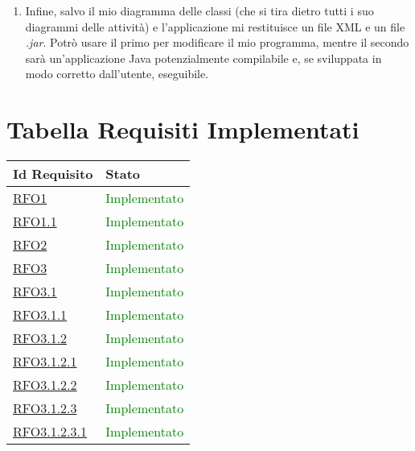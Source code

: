 \begin{enumerate}
	\item Infine, salvo il mio diagramma delle classi (che si tira dietro tutti i suo diagrammi delle attività) e l'applicazione mi restituisce un file XML e un file \emph{.jar}. Potrò usare il primo per modificare il mio programma, mentre il secondo sarà un'applicazione Java potenzialmente compilabile e, se sviluppata in modo corretto dall'utente, eseguibile.
\end{enumerate}


\appendix
\section{Tabella Requisiti Implementati}
\normalsize
\begin{longtable}{|>{\centering}m{5cm}|m{5cm}<{\centering}|}
\hline
\textbf{Id Requisito} & \textbf{Stato}\\
\hline
\endhead
\hyperlink{RFO1}{RFO1} & \textcolor{green}{Implementato} \\ \hline

\hyperlink{RFO1.1}{RFO1.1} & \textcolor{green}{Implementato}\\ \hline

\hyperlink{RFO2}{RFO2}  &  \textcolor{green}{Implementato} \\ \hline

\hyperlink{RFO3}{RFO3} &  \textcolor{green}{Implementato}\\ \hline

\hyperlink{RFO3.1}{RFO3.1} &  \textcolor{green}{Implementato}\\ \hline

\hyperlink{RFO3.1.1}{RFO3.1.1} &  \textcolor{green}{Implementato}\\ \hline

\hyperlink{RFO3.1.2}{RFO3.1.2} &  \textcolor{green}{Implementato}\\ \hline

\hyperlink{RFO3.1.2.1}{RFO3.1.2.1} &  \textcolor{green}{Implementato}\\ \hline

\hyperlink{RFO3.1.2.2}{RFO3.1.2.2} &  \textcolor{green}{Implementato}\\ \hline

\hyperlink{RFO3.1.2.3}{RFO3.1.2.3} &  \textcolor{green}{Implementato}\\ \hline

\hyperlink{RFO3.1.2.3.1}{RFO3.1.2.3.1} &  \textcolor{green}{Implementato}\\ \hline


\end{longtable}
